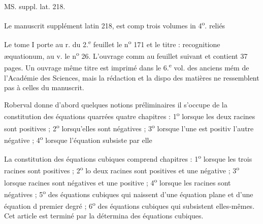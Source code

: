 \documentclass[11pt,a4paper]{article}
\begin{document}

MS. suppl. lat. 218.

Le manuscrit supplément latin 218, est comp trois volumes in 4\textsuperscript{o}. reliés

Le tome I porte au r. du 2.\textsuperscript{e} feuillet le n\textsuperscript{o} 171 et le titre : \ill{} recognitione æquationum, au v. le n\textsuperscript{o} 26. L'ouvrage comm au feuillet suivant et contient 37 pages. Un ouvrage \ill{} même titre est imprimé dans le 6.\textsuperscript{e} vol. des anciens mém de l'Académie des Sciences, mais la rédaction et la dispo des matières ne ressemblent pas à celles du manuscrit.

Roberval donne d'abord quelques notions préliminaires
il s'occupe de la constitution des équations quarrées \ill{} quatre chapitres : 1\textsuperscript{o} lorsque les deux racines sont positives ; 2\textsuperscript{o} lorsqu'elles sont négatives ; 3\textsuperscript{o} lorsque l'une est positiv
l'autre négative ; 4\textsuperscript{o} lorsque l'équation subsiste par elle\ill{}

La constitution des équations cubiques comprend \ill{} chapitres : 1\textsuperscript{o} lorsque les trois racines sont positives ; 2\textsuperscript{o} lo
deux racines sont positives et une négative ; 3\textsuperscript{o} lorsque \ill{} racines sont négatives et une positive ; 4\textsuperscript{o} lorsque les \ill{}
racines sont négatives ; 5\textsuperscript{o} des équations cubiques qui naissent d'une équation plane et d'une équation d\ill{} premier degré ; 6\textsuperscript{o} des équations cubiques qui subsistent \ill{}
elles-mêmes. Cet article est terminé par la détermina des équations cubiques.
\end{document}
